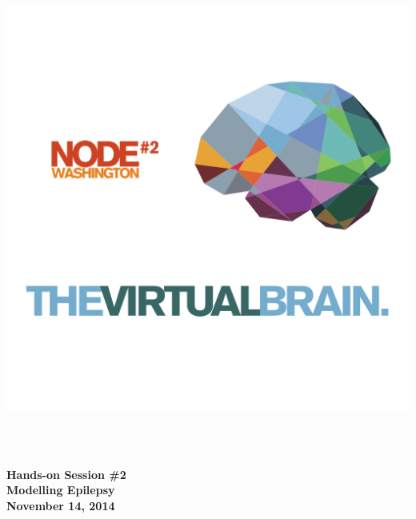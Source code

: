 \thispagestyle{plain}
\begin{titlepage}
\begin{center}
\includegraphics[width=1.5\textwidth]{./tvb_logo_transparent_square.png}~\\[0.5cm]

\begin{fullwidth}
\HRule \\[0.2cm]
\begin{center}
{ \huge \bfseries Hands-on Session \#2 \\ [0.2cm] Modelling Epilepsy \\[0.1cm] }
{ \large \bfseries November 14, 2014 \\[0.2cm]}
\end{center}
\HRule \\[0.2cm]
\end{fullwidth}

\end{center}
\end{titlepage}
